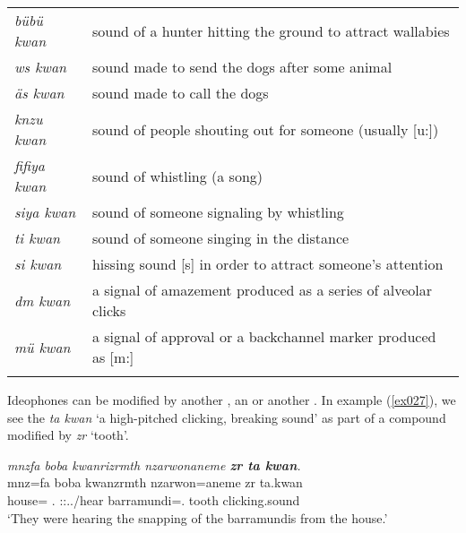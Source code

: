 {\begin{table}
\begin{tabularx}{\textwidth}{Xl}
		\tablevspace
		\multicolumn{2}{l}{{human made signal sounds}}\\ \midrule
		\emph{bübü kwan}&sound of a hunter hitting the ground to attract wallabies\\
		\emph{ws kwan}&sound made to send the dogs after some animal\\
		\emph{äs kwan}&sound made to call the dogs\\
		\emph{knzu kwan}&sound of people shouting out for someone (usually [u:])\\
		\emph{fifiya kwan}&sound of whistling (a song)\\
		\emph{siya kwan}&sound of someone signaling by whistling\\
		\emph{ti kwan}&sound of someone singing in the distance\\
		\emph{si kwan}&hissing sound [s] in order to attract someone's attention\\
		\emph{dm kwan}&a signal of amazement produced as a series of alveolar clicks\\
		\emph{mü kwan}&a signal of approval or a backchannel marker produced as [m:]\\
		\lspbottomrule
	\end{tabularx}
\end{table}}%

Ideophones can be modified by another , an  or another . In example (\ref{ex027}), we see the  \emph{ta kwan} `a high-pitched clicking, breaking sound' as part of a compound modified by \emph{zr} `tooth'.

\begin{exe}
	\ex \emph{mnzfa boba kwanrizrmth nzarwonaneme \textbf{zr ta kwan}.}\\
	\gll mnz=fa boba kwanzrmth nzarwon=aneme zr ta.kwan\\
	house=\Abl{} \Med{}.\Abl{} \Stpl:\Sbj:\Pst.\Dur.\Venit/hear barramundi=\Poss{}.\Nsg{} tooth {clicking.sound}\\
	\trans `They were hearing the snapping of the barramundis from the house.'\\ 
	\label{ex027}
\end{exe}

